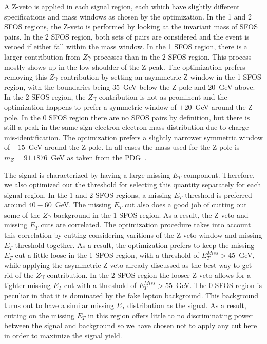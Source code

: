 A Z-veto is applied in each signal region, 
each which have slightly different specifications and mass windows
as chosen by the optimization. In the 1 and 2 SFOS regions, the Z-veto is performed
by looking at the invariant mass of SFOS pairs. In the 2 SFOS region, both sets of pairs
are considered and the event is vetoed if either fall within the mass window.  In the 
1 SFOS region, there is a larger contribution from $Z\gamma$ processes than in the 2 SFOS
region.  This process mostly shows up in the low shoulder of the Z peak. The optimization
prefers removing this $Z\gamma$ contribution by setting an asymmetric Z-window in the 1 SFOS
region, with the boundaries being 35~GeV below the Z-pole and 20~GeV above. In the 2 SFOS region,
the $Z\gamma$ contribution is not as prominent and the optimization happens to prefer a symmetric
window of $\pm20$~GeV around the Z-pole.  In the 0 SFOS region there are no SFOS pairs by definition,
but there is still a peak in the same-sign electron-electron mass distribution due to charge mis-identification.
The optimization prefers a slightly narrower symmetric window of $\pm15$~GeV around the Z-pole. In all cases
the mass used for the Z-pole is $m_{Z}=91.1876$~GeV as taken from the PDG~\cite{PDG:2014}. 

The signal is characterized by having a large missing $E_{T}$ component.  Therefore, we also 
optimized our the threshold for selecting this quantity separately for each signal region. 
In the 1 and 2 SFOS regions, a missing $E_{T}$ threshold is preferred around $40-60$~GeV.
The missing $E_{T}$ cut also does a good job of cutting out some of the $Z\gamma$ background in the 1 
SFOS region.  As a result, the Z-veto and missing $E_{T}$ cuts are correlated.  The optimization
procedure takes into account this correlation by cutting considering varitions of the Z-veto window
and missing $E_{T}$ threshold together.  As a result, the optimization prefers to keep the missing $E_{T}$ 
cut a little loose in the 1 SFOS region, with a threshold of $E_{T}^{Miss} > 45$~GeV,
while applying the asymmetric Z-veto already discussed as the best 
way to get rid of the $Z\gamma$ contribution.  In the 2 SFOS region the looser Z-veto allows for a tighter
missing $E_{T}$ cut with a threshold of $E_{T}^{Miss} > 55$~GeV. The 0 SFOS region is peculiar in that it is 
dominated by the fake lepton background.  This background turns out to have a similar missing $E_{T}$ distribution
as the signal. As a result, cutting on the missing $E_{T}$ in this region offers little to no discriminating power
between the signal and background so we have chosen not to apply any cut here in order to maximize the signal yield.


